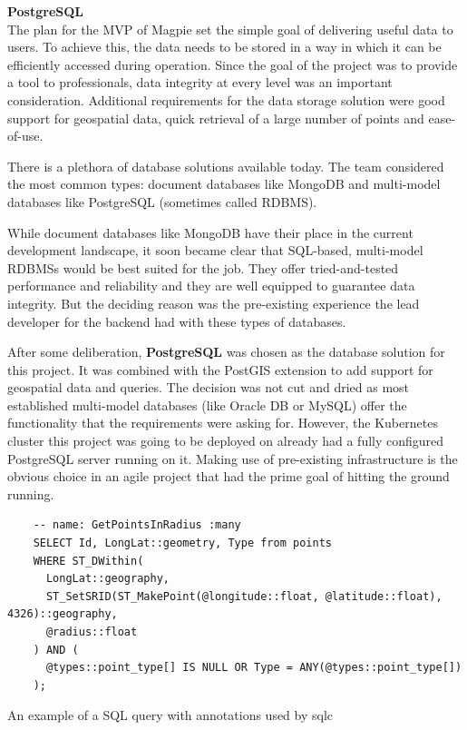 \textbf{PostgreSQL}\\
The plan for the MVP of Magpie set the simple goal of delivering useful data to
users. To achieve this, the data needs to be stored in a way in which it can be
efficiently accessed during operation. Since the goal of the project was to
provide a tool to professionals, data integrity at every level was an important
consideration. Additional requirements for the data storage solution were good
support for geospatial data, quick retrieval of a large number of points and
ease-of-use.

There is a plethora of database solutions available today. The team considered
the most common types: document databases like MongoDB and multi-model databases
like PostgreSQL (sometimes called RDBMS).

While document databases like MongoDB have their place in the current
development landscape, it soon became clear that SQL-based, multi-model RDBMSs
would be best suited for the job. They offer tried-and-tested performance and
reliability and they are well equipped to guarantee data integrity. But the
deciding reason was the pre-existing experience the lead developer for the
backend had with these types of databases.

After some deliberation, \textbf{PostgreSQL} was chosen as the database solution for this
project. It was combined with the PostGIS extension to add support for
geospatial data and queries. The decision was not cut and dried as most
established multi-model databases (like Oracle DB or MySQL) offer the
functionality that the requirements were asking for. However, the Kubernetes
cluster this project was going to be deployed on already had a fully configured
PostgreSQL server running on it. Making use of pre-existing infrastructure is
the obvious choice in an agile project that had the prime goal of hitting the
ground running.

\begin{listing}[htbp]
  \centering{}
  \begin{minipage}{\textwidth}
  \begin{verbatim}
    -- name: GetPointsInRadius :many
    SELECT Id, LongLat::geometry, Type from points
    WHERE ST_DWithin(
      LongLat::geography,
      ST_SetSRID(ST_MakePoint(@longitude::float, @latitude::float), 4326)::geography,
      @radius::float
    ) AND (
      @types::point_type[] IS NULL OR Type = ANY(@types::point_type[])
    );
  \end{verbatim}
  \end{minipage}
  \caption{An example of a SQL query with annotations used by sqlc}
  \label{listing:sqlc_query_input}
\end{listing}

